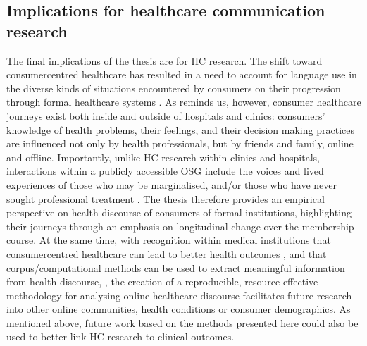 \subsection{Implications for healthcare communication research}

The final implications of the thesis are for \gls{HC} research. The shift toward \gls{consumercentred} healthcare has resulted in a need to account for language use in the diverse kinds of situations encountered by consumers on their progression through formal healthcare systems \cite{matthiessen_applying_2013,slade_emergency_2008}. As \textcite{jones_health_2013} reminds us, however, consumer healthcare journeys exist both inside and outside of hospitals and clinics: consumers' knowledge of health problems, their feelings, and their decision making practices are influenced not only by health professionals, but by friends and family, online and offline. Importantly, unlike \gls{HC} research within clinics and hospitals, interactions within a publicly accessible \gls{OSG} include the voices and lived experiences of those who may be marginalised, and\slash or those who have never sought professional treatment \cite{harvey_disclosures_2012,mautner_time_2005}. The thesis therefore provides an empirical perspective on health discourse of consumers of formal institutions, highlighting their journeys through an emphasis on longitudinal change over the membership course. At the same time, with recognition within medical institutions that \gls{consumercentred} healthcare can lead to better health outcomes \cite{woodward-kron_international_2016}, and that corpus\slash computational methods can be used to extract meaningful information from health discourse, \cite{mayfield_automating_2014}, the creation of a reproducible, resource\hyp{}effective methodology for analysing online healthcare discourse facilitates future research into other online communities, health conditions or consumer demographics. As mentioned above, future work based on the methods presented here could also be used to better link \gls{HC} research to clinical outcomes.



